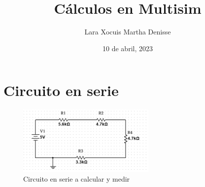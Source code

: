 \documentclass[letterpaper,12pt]{article}
\title {\textbf{Cálculos en Multisim}}
\author{Lara Xocuis Martha Denisse}
\date{10 de abril, 2023}
\begin{document}
\maketitle

\begin{sloppypar} 
\section{Circuito en serie}
\begin{figure}[H]
    \centering
    \includegraphics[width=0.6\textwidth]{images/proytec/cir.png}
    \caption{Circuito en serie a calcular y medir}
\end{figure}

\renewcommand{\theenumi}{\alph{enumi}}


\end{sloppypar}
\end{document}
